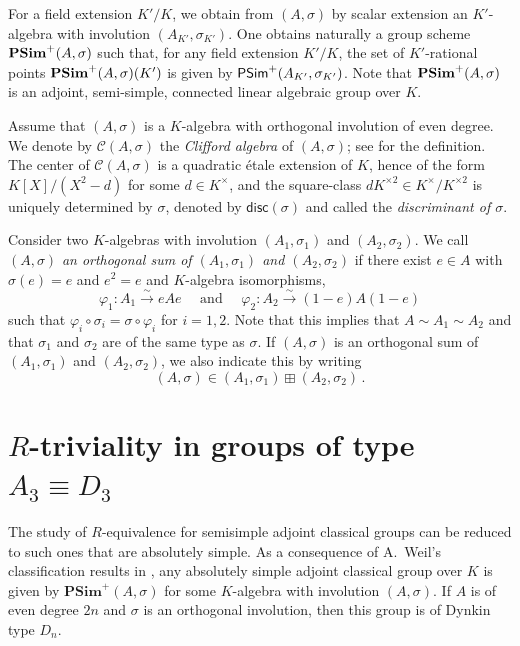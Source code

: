\documentclass[twoside,11pt]{amsart}
\numberwithin{equation}{section}
\theoremstyle{definition}
\newcommand{\vf}{\varphi}
\newcommand{\mg}[1]{{#1}^{\times}}
\newcommand{\sq}[1]{{#1}^{\times 2}}
\newcommand{\scg}[1]{\mg{#1}/\sq{#1}}
\newcommand{\s}{\sigma}
\newcommand{\mc}{\mathcal}
\newcommand{\disc}{\mathsf{disc}}
\newcommand{\PSim}{{\bf\mathsf{PSim}}}
\newcommand{\Cl}{\mc{C}}
\begin{document}
For a field extension $K'/K$, we obtain from $(A,\s)$ by scalar extension an $K'$-algebra with involution $(A_{K'},\s_{K'})$.
One obtains naturally a group scheme ${\bf PSim}^+(A,\s)$ such that, for any field extension $K'/K$, the set of $K'$-rational points 
${\bf PSim}^+(A,\s)(K')$ is given by $\PSim^+(A_{K'},\s_{K'})$.
Note that ${\bf PSim}^+(A,\s)$ is an adjoint, semi-simple, connected linear algebraic group over $K$.

Assume that $(A,\s)$ is a $K$-algebra with orthogonal involution of even degree.
We denote by $\Cl(A,\s)$ the \emph{Clifford algebra} of $(A,\s)$; see \cite[\S 8]{KMRT98} for the definition.
The center of $\Cl(A,\s)$ is a quadratic \'etale extension of $K$, hence of the form $K[X]/(X^2-d)$ for some $d\in\mg{K}$, and the square-class $d\sq{K}\in\scg{K}$ is uniquely determined by $\s$, denoted by $\disc(\s)$ and called the \emph{discriminant of $\s$}.

Consider two $K$-algebras with involution $(A_1, \s_1)$ and $(A_2,\s_2)$. 
We call $(A,\s)$ \emph{an orthogonal sum of  $(A_1, \s_1)$ and $(A_2,\s_2)$} if there exist $e\in A$ with $\s(e)=e$ and $e^2=e$ and $K$-algebra isomorphisms, $$\vf_1:A_1\xrightarrow{\sim}eAe\quad\mbox{ and }\quad \vf_2:A_2\xrightarrow{\sim}(1-e)A(1-e)$$
such that $ \vf_i\circ \s_i=\s\circ \vf_i$ for $i=1,2$. 
Note that this implies that $A\sim A_1\sim A_2$ and that $\s_1$ and $\s_2$ are of the same type as $\s$.
If $(A,\s)$ is an orthogonal sum of $(A_1,\s_1)$ and $(A_2,\s_2)$, we also indicate this by writing
$$(A,\s)\in (A_1,\s_1)\boxplus (A_2,\s_2)\,.$$



\section{$R$-triviality in groups of type $A_3\equiv D_3$}

The study of $R$-equivalence for semisimple adjoint classical groups 
can be reduced to such ones that are absolutely simple.
As a consequence of A.~Weil's classification results in \cite{Wei61}, any absolutely simple adjoint classical group over $K$ is 
given by $\mathbf{PSim}^+(A,\s)$ for some $K$-algebra with involution $(A,\s)$.
If $A$ is of even degree $2n$ and $\s$ is an orthogonal involution, then this group is of Dynkin type $D_n$.



 




\medskip
\end{document}
